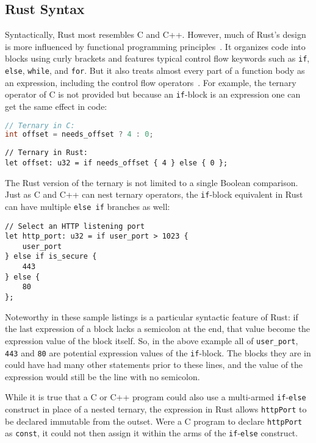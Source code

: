 \subsection{Rust Syntax}

Syntactically, Rust most resembles C and C++. However, much of Rust's design is more influenced by functional programming principles~\cite[Chapter~13]{rpl.2019}. It organizes code into blocks using curly brackets and features typical control flow keywords such as \texttt{if}, \texttt{else}, \texttt{while}, and \texttt{for}. But it also treats almost every part of a function body as an expression, including the control flow operators~\cite[Chapter~6]{programming.rust.2021}. For example, the ternary operator of C is not provided but because an \texttt{if}-block is an expression one can get the same effect in code:

\begin{lstlisting}[language=C]
// Ternary in C:
int offset = needs_offset ? 4 : 0;
\end{lstlisting}

\begin{lstlisting}
// Ternary in Rust:
let offset: u32 = if needs_offset { 4 } else { 0 };
\end{lstlisting}

The Rust version of the ternary is not limited to a single Boolean comparison. Just as C and C++ can nest ternary operators, the \texttt{if}-block equivalent in Rust can have multiple \texttt{else if} branches as well:

\begin{lstlisting}
// Select an HTTP listening port
let http_port: u32 = if user_port > 1023 {
    user_port
} else if is_secure {
    443
} else {
    80
};
\end{lstlisting}

Noteworthy in these sample listings is a particular syntactic feature of Rust: if the last expression of a block lacks a semicolon at the end, that value become the expression value of the block itself. So, in the above example all of \texttt{user\_port}, \texttt{443} and \texttt{80} are potential expression values of the \texttt{if}-block. The blocks they are in could have had many other statements prior to these lines, and the value of the expression would still be the line with no semicolon.

While it is true that a C or C++ program could also use a multi-armed \texttt{if}-\texttt{else} construct in place of a nested ternary, the expression in Rust allows \texttt{httpPort} to be declared immutable from the outset. Were a C program to declare \texttt{httpPort} as \texttt{const}, it could not then assign it within the arms of the \texttt{if}-\texttt{else} construct.

